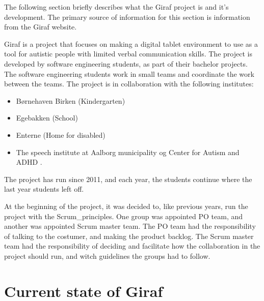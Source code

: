 
The following section briefly describes what the Giraf project is and it's development. The primary source of information for this section is information from the Giraf website\cite{GirafWebsite}.


Giraf is a project that focuses on making a digital tablet environment to use as a tool for autistic people with limited verbal communication skills. The project is developed by software engineering students, as part of their bachelor projects.  The software engineering students work in small teams and coordinate the work between the teams. The project is in collaboration with the following institutes:

\begin{itemize}
    \item Børnehaven Birken (Kindergarten) \cite{bhBirken} 
    \item Egebakken (School) \cite{egebakken} 
    \item Enterne (Home for disabled) \cite{enterne}
    \item The speech institute at Aalborg municipality og Center for Autism and ADHD \cite{center_for_autism}.     
\end{itemize} 
The project has run since 2011, and each year, the students continue where the last year students left off. \newline 

\par \noindent
At the beginning of the project, it was decided to, like previous years, run the project with the \gls{Scrum_principles}. One group was appointed \gls{PO} team, and another was appointed Scrum master team. The \gls{PO} team had the responsibility of talking to the costumer, and making the product backlog. The Scrum master team had the responsibility of deciding  and facilitate how the collaboration in the project should run, and witch guidelines the groups had to follow. 

\section{Current state of Giraf}

